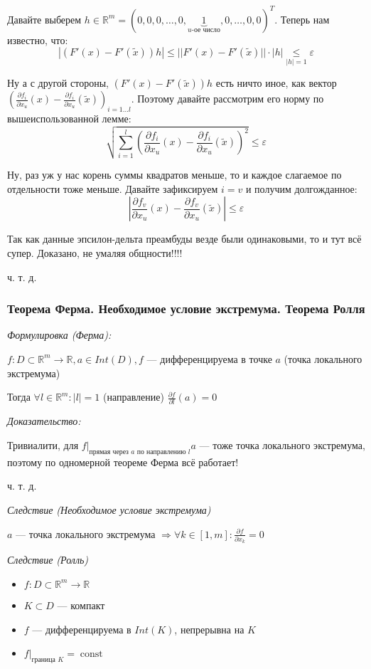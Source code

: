 \documentclass{article}
\DeclareMathOperator{\const}{const}
\begin{document}
Давайте выберем $h \in \mathbb{R}^m = (0,0,0, \ldots, 0, \underbrace{1}_{u\text{-ое число}}, 0, \ldots, 0, 0)^T$.
Теперь нам известно, что:
\[|(F'(x) - F'(\widetilde{x}))h| \le ||F'(x) - F'(\widetilde{x})|| \cdot |h| \underset{|h| = 1}{\le} \varepsilon\]

Ну а с другой стороны, $(F'(x) - F'(\widetilde{x}))h$ есть ничто иное, как вектор $\left(\frac{\partial f_i}{\partial x_u}(x) - \frac{\partial f_i}{\partial x_u}(\widetilde{x})\right)_{i = 1 \ldots l}$. Поэтому давайте рассмотрим его норму по вышеиспользованной лемме:
\[\sqrt{\sum_{i = 1}^l{\left(\frac{\partial f_i}{\partial x_u}(x) - \frac{\partial f_i}{\partial x_u}(\widetilde{x})\right)^2}} \le \varepsilon\]

Ну, раз уж у нас корень суммы квадратов меньше, то и каждое слагаемое по отдельности тоже меньше. Давайте зафиксируем $i = v$ и получим долгожданное:
\[\left|\frac{\partial f_v}{\partial x_u}(x) - \frac{\partial f_v}{\partial x_u}(\widetilde{x})\right| \le \varepsilon\]

Так как данные эпсилон-дельта преамбуды везде были одинаковыми, то и тут всё супер. Доказано, не умаляя общности!!!!

ч. т. д.

\subsubsection{Теорема Ферма. Необходимое условие экстремума. Теорема Ролля}
\textit{Формулировка (Ферма):}

$f: D \subset \mathbb{R}^m \rightarrow \mathbb{R}, a \in Int(D), f$ --- дифференцируема в точке $a$ (точка локального экстремума)

Тогда $\forall l \in \mathbb{R}^m: |l| = 1$ (направление) $\frac{\partial f}{\partial l}(a) = 0$


\textit{Доказательство:}

Тривиалити, для $f|_{\text{прямая через }a\text{ по направлению }l} a$ --- тоже точка локального экстремума, поэтому по одномерной теореме Ферма всё работает!

ч. т. д.

\textit{Следствие (Необходимое условие экстремума)}

$a$ --- точка локального экстремума $\Rightarrow \forall k \in [1, m]: \frac{\partial f}{\partial x_k} = 0$

\textit{Следствие (Ролль)}
\begin{itemize}
    \item $f: D \subset \mathbb{R}^m \rightarrow \mathbb{R}$
    \item $K \subset D$ --- компакт
    \item $f$ --- дифференцируема в $Int(K)$, непрерывна на $K$
    \item $f|_{\text{граница }K} = \const$
\end{itemize}
\end{document}
